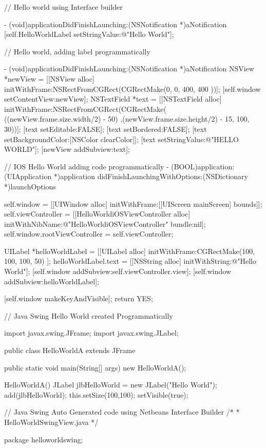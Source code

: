 // Hello world using Interface builder

- (void)applicationDidFinishLaunching:(NSNotification *)aNotification
{
    [self.HelloWorldLabel setStringValue:@"Hello World"];
}


// Hello world, adding label programmatically 

- (void)applicationDidFinishLaunching:(NSNotification *)aNotification
{
    NSView *newView = [[NSView alloc] initWithFrame:NSRectFromCGRect(CGRectMake(0, 0, 400, 400 ))];
    [self.window setContentView:newView];
    NSTextField *text = [[NSTextField alloc] initWithFrame:NSRectFromCGRect(CGRectMake( ((newView.frame.size.width/2) - 50) ,(newView.frame.size.height/2) - 15,  100, 30))];
    [text setEditable:FALSE];
    [text setBordered:FALSE];
    [text setBackgroundColor:[NSColor clearColor]];
    [text setStringValue:@"HELLO WORLD"];
    [newView addSubview:text];
}

// IOS Hello World adding code programmatically
- (BOOL)application:(UIApplication *)application didFinishLaunchingWithOptions:(NSDictionary *)launchOptions
{
    self.window = [[UIWindow alloc] initWithFrame:[[UIScreen mainScreen] bounds]];
    self.viewController = [[HelloWorldiOSViewController alloc] initWithNibName:@"HelloWorldiOSViewController" bundle:nil]; 
    self.window.rootViewController = self.viewController;
        
    UILabel *helloWorldLabel = [[UILabel alloc] initWithFrame:CGRectMake(100, 100, 100, 50)  ];
    helloWorldLabel.text = [[NSString alloc] initWithString:@"Hello World"];
    [self.window addSubview:self.viewController.view];
    [self.window addSubview:helloWorldLabel];

    [self.window makeKeyAndVisible];
    return YES;
}

// Java Swing Hello World created Programmatically

import javax.swing.JFrame;
import javax.swing.JLabel;

public class HelloWorldA extends JFrame{
    public static void main(String[] args) 
    {
        new HelloWorldA();
    }
    
    HelloWorldA()
    {
        JLabel jlbHelloWorld = new JLabel("Hello World");
        add(jlbHelloWorld);
        this.setSize(100,100);
        setVisible(true);
    }
}

// Java Swing Auto Generated code using Netbeans Interface Builder
/*
 * HelloWorldSwingView.java
 */

package helloworldswing;

